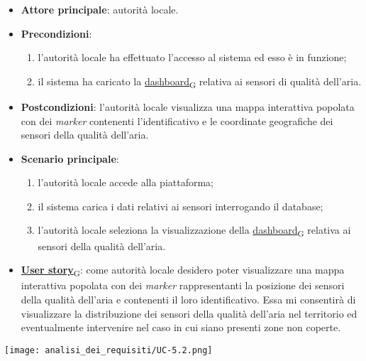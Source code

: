 \begin{itemize}
	\item \textbf{Attore principale}: autorità locale.
	\item \textbf{Precondizioni}:
	      \begin{enumerate}
		      \item l'autorità locale ha effettuato l'accesso al sistema ed esso è in funzione;
		      \item il sistema ha caricato la \href{https://7last.github.io/docs/pb/documentazione-interna/glossario\#dashboard}{dashboard\textsubscript{G}} relativa ai sensori di qualità dell'aria.
	      \end{enumerate}
	\item \textbf{Postcondizioni}: l'autorità locale visualizza una mappa interattiva popolata con dei \textit{marker} contenenti l'identificativo e le coordinate geografiche dei sensori della qualità dell'aria.
	\item \textbf{Scenario principale}:
	      \begin{enumerate}
		      \item l'autorità locale accede alla piattaforma;
		      \item il sistema carica i dati relativi ai sensori interrogando il database;
		      \item l'autorità locale seleziona la visualizzazione della \href{https://7last.github.io/docs/pb/documentazione-interna/glossario\#dashboard}{dashboard\textsubscript{G}} relativa ai sensori della qualità dell'aria.
	      \end{enumerate}
	\item \href{https://7last.github.io/docs/pb/documentazione-interna/glossario\#user-story}{\textbf{User story}\textsubscript{G}}:
	      come autorità locale desidero poter visualizzare una mappa interattiva popolata con dei \textit{marker} rappresentanti la posizione dei sensori della qualità dell'aria
	      e contenenti il loro identificativo. Essa mi consentirà di visualizzare la distribuzione dei sensori della qualità dell'aria nel territorio ed eventualmente intervenire nel caso in cui siano presenti zone non coperte.
\end{itemize}
\begin{center}
	\texttt{[image: analisi\_dei\_requisiti/UC-5.2.png]}
\end{center}


